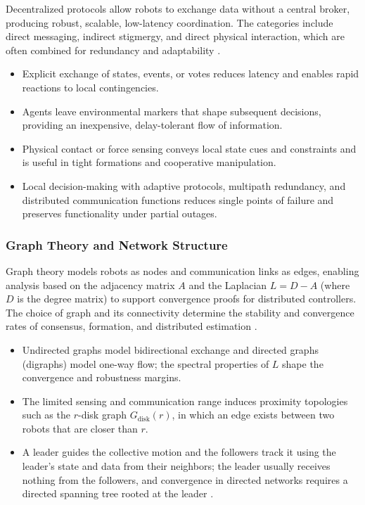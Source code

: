 Decentralized protocols allow robots to exchange data without a central broker,
producing robust, scalable, low-latency coordination. The categories include
direct messaging, indirect stigmergy, and direct physical interaction, which are
often combined for redundancy and adaptability \cite{brambilla2013swarm,dias2021swarm}.
\begin{itemize}
  \item {} Explicit exchange of states,
        events, or votes reduces latency and enables rapid reactions to local
        contingencies.
  \item {} Agents leave environmental
        markers that shape subsequent decisions, providing an inexpensive,
        delay-tolerant flow of information.
  \item {} Physical contact or force sensing conveys local
        state cues and constraints and is useful in tight formations and
        cooperative manipulation.
  \item {} Local decision-making with adaptive protocols,
        multipath redundancy, and distributed communication functions reduces
        single points of failure and preserves functionality under partial
        outages.
\end{itemize}

\subsubsection{Graph Theory and Network Structure}

Graph theory models robots as nodes and communication links as edges, enabling
analysis based on the adjacency matrix $A$ and the Laplacian $L = D - A$ (where
$D$ is the degree matrix) to support convergence proofs for distributed
controllers. The choice of graph and its connectivity determine the stability
and convergence rates of consensus, formation, and distributed estimation
\cite{mesbahi2010graph,bullo2009distributed}.
\begin{itemize}
  \item {} Undirected graphs model bidirectional exchange and
        directed graphs (digraphs) model one-way flow; the spectral properties of
        $L$ shape the convergence and robustness margins.
  \item {} The limited sensing and communication range
        induces proximity topologies such as the $r$-disk graph
        $G_{\mathrm{disk}}(r)$, in which an edge exists between two robots that
        are closer than $r$.
  \item {} A leader guides the collective motion
        and the followers track it using the leader's state and data from their
        neighbors; the leader usually receives nothing from the followers, and
        convergence in directed networks requires a directed spanning tree rooted
        at the leader \cite{li2014cooperative}.
\end{itemize}

